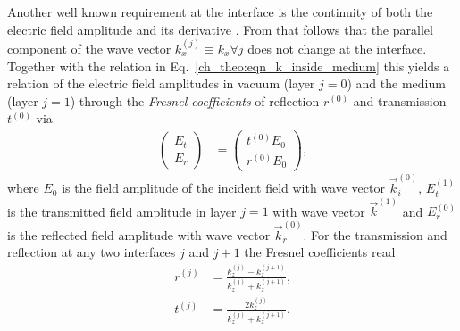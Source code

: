 Another well known requirement at the interface is the continuity of both the electric field amplitude and its derivative \cite{born_principles_1965, gibaud_specular_2009}. From that follows that the parallel component of the wave vector $k_x^{(j)} \equiv k_x \forall j$ does not change at the interface. Together with the relation in Eq.~\ref{ch_theo:eqn_k_inside_medium} this yields a relation of the electric field amplitudes in vacuum (layer $j=0$) and the medium (layer $j=1$) through the \emph{Fresnel coefficients} of reflection $r^{(0)}$ and transmission $t^{(0)}$ via
\begin{align}
\begin{pmatrix}
E_t  \\ 
E_r 
\end{pmatrix} &=
\begin{pmatrix}
t^{(0)} E_0 \\
r^{(0)} E_0
\end{pmatrix} \text{,} \label{ch_theo:eqn_fresnel_reflection}
\end{align}
where $E_0$ is the field amplitude of the incident field with wave vector $\vec{k}_i^{(0)}$, $E_t^{(1)}$ is the transmitted field amplitude in layer $j=1$ with wave vector $\vec{k}^{(1)}$ and $E_r^{(0)}$ is the reflected field amplitude with wave vector $\vec{k}_r^{(0)}$. For the transmission and reflection at any two interfaces $j$ and $j+1$ the Fresnel coefficients read
\begin{align}
        r^{(j)} &= \frac{k_z^{(j)} - k_z^{(j+1)}}{k_z^{(j)} + 
k_z^{(j+1)}}\text{,}  \label{ch_theo:eqn_fresnel_reflection_coefficient}\\
        t^{(j)} &= \frac{2 k_z^{(j)}}{k_z^{(j)} + k_z^{(j+1)}}\text{.}  \label{ch_theo:eqn_fresnel_transmission_coefficient}
\end{align}

